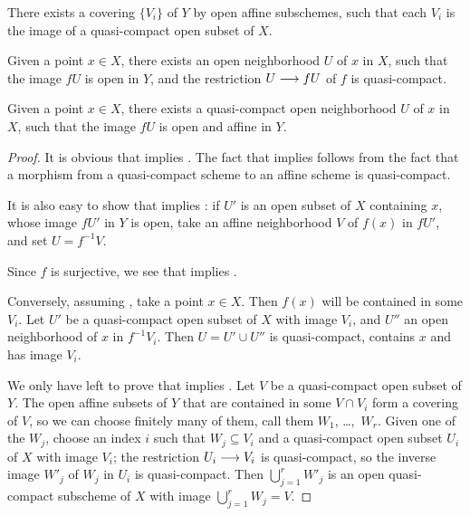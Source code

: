 \begin{2   CONTRAVARIANT FUNCTORS}
\begin{2.3 Sheaves in Grothendieck topologies}
\begin{proposition}
\begin{enumeratei}
 There exists a covering $\{V_i\}$ of $Y$ by open affine subschemes, such that each $V_i$ is the image of a quasi-compact open subset of $X$.

 Given a point $x \in X$, there exists an open neighborhood $U$ of $x$ in $X$, such that the image $fU$ is open in $Y$, and the restriction $U \arr fU$ of $f$ is quasi-compact.

 Given a point $x \in X$, there exists a quasi-compact open neighborhood $U$ of $x$ in $X$, such that the image $fU$ is open and affine in $Y$.

\end{enumeratei}
\end{proposition}


\begin{proof}

It is obvious that  implies . The fact that  implies  follows from the fact that a morphism from a quasi-compact scheme to an affine scheme is quasi-compact.

It is also easy to show that  implies : if $U'$ is an open subset of $X$ containing $x$, whose image $fU'$ in $Y$ is open, take an affine neighborhood $V$ of $f(x)$ in $fU'$, and set $U = f^{-1}V$.

Since $f$ is surjective, we see that  implies .

Conversely, assuming , take a point $x \in X$. Then $f(x)$ will be contained in some $V_i$. Let $U'$ be a quasi-compact open subset of $X$ with image $V_i$, and $U''$ an open neighborhood of $x$ in $f ^{-1} V_i$. Then $U = U' \cup U''$ is quasi-compact, contains $x$ and has image $V_i$.

We only have left to prove that  implies . Let $V$ be a quasi-compact open subset of $Y$. The open affine subsets of $Y$ that are contained in some $V \cap V_i$ form a covering of $V$, so we can choose finitely many of them, call them $W_1$, \dots,~$W_r$. Given one of the $W_j$, choose an index $i$ such that $W_j \subseteq V_i$ and a quasi-compact open subset $U_i$ of $X$ with image $V_i$; the restriction $U_i \arr V_i$ is quasi-compact, so the inverse image $W'_j$ of $W_j$ in $U_i$ is quasi-compact. Then $\bigcup_{j=1}^r W'_j$ is an open quasi-compact subscheme of $X$ with image $\bigcup_{j=1}^r W_j = V$.
\end{proof}


\end{2.3 Sheaves in Grothendieck topologies}
\end{2   CONTRAVARIANT FUNCTORS}
